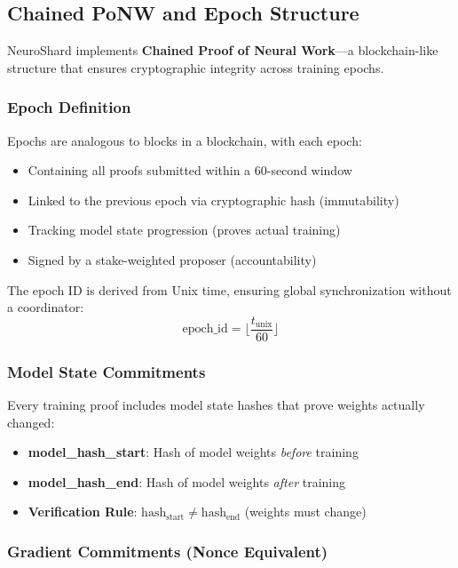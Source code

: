 \documentclass[11pt,a4paper]{article}
\begin{document}
\subsection{Chained PoNW and Epoch Structure}

NeuroShard implements \textbf{Chained Proof of Neural Work}---a blockchain-like structure that ensures cryptographic integrity across training epochs.

\subsubsection{Epoch Definition}

Epochs are analogous to blocks in a blockchain, with each epoch:
\begin{itemize}
    \item Containing all proofs submitted within a 60-second window
    \item Linked to the previous epoch via cryptographic hash (immutability)
    \item Tracking model state progression (proves actual training)
    \item Signed by a stake-weighted proposer (accountability)
\end{itemize}

The epoch ID is derived from Unix time, ensuring global synchronization without a coordinator:
\begin{equation}
\text{epoch\_id} = \lfloor \frac{t_{\text{unix}}}{60} \rfloor
\end{equation}

\subsubsection{Model State Commitments}

Every training proof includes model state hashes that prove weights actually changed:

\begin{itemize}
    \item \textbf{model\_hash\_start}: Hash of model weights \textit{before} training
    \item \textbf{model\_hash\_end}: Hash of model weights \textit{after} training
    \item \textbf{Verification Rule}: $\text{hash}_{\text{start}} \neq \text{hash}_{\text{end}}$ (weights must change)
\end{itemize}

\subsubsection{Gradient Commitments (Nonce Equivalent)}
\end{document}

